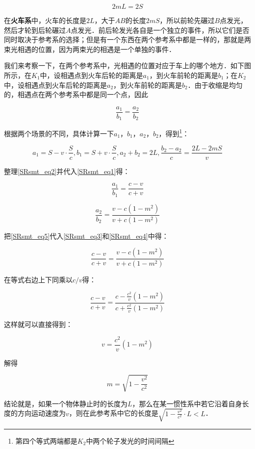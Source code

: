 \begin{equation}\label{SRsmt_eq1}
2mL=2S
\end{equation}

在\textbf{火车系}中，火车的长度是$2L$，大于$AB$的长度$2mS$，所以前轮先碾过$B$点发光，然后才轮到后轮碾过$A$点发光．前后轮发光各自是一个独立的事件，所以它们是否同时取决于参考系的选择；但是有一个东西在两个参考系中都是一样的，那就是两束光相遇的位置，因为两束光的相遇是一个单独的事件．

我们来考察一下，在两个参考系中，光相遇的位置对应于车上的哪个地方．如下图所示，在$K_1$中，设相遇点到火车后轮的距离是$a_1$，到火车前轮的距离是$b_1$；在$K_2$中，设相遇点到火车后轮的距离是$a_2$，到火车前轮的距离是$b_2$．由于收缩是均匀的，相遇点在两个参考系中都是同一个点，因此

\begin{equation}\label{SRsmt_eq5}
\frac{a_1}{b_1}=\frac{a_2}{b_2}
\end{equation}

根据两个场景的不同，具体计算一下$a_1$，$b_1$，$a_2$，$b_2$，得到\footnote{第四个等式两端都是$K_2$中两个轮子发光的时间间隔}：

\begin{equation}\label{SRsmt_eq2}
a_1=S-v\cdot\frac{S}{c},b_1=S+v\cdot\frac{S}{c},a_2+b_2=2L,\frac{b_2-a_2}{c}=\frac{2L-2mS}{v}
\end{equation}

整理\autoref{SRsmt_eq2}并代入\autoref{SRsmt_eq1}得：

\begin{equation}\label{SRsmt_eq3}
\frac{a_1}{b_1}=\frac{c-v}{c+v}
\end{equation}

\begin{equation}\label{SRsmt_eq4}
\frac{a_2}{b_2}=\frac{v-c(1-m^2)}{v+c(1-m^2)}
\end{equation}

把\autoref{SRsmt_eq5}代入\autoref{SRsmt_eq3}和\autoref{SRsmt_eq4}中得：

\begin{equation}
\frac{c-v}{c+v}=\frac{v-c(1-m^2)}{v+c(1-m^2)}
\end{equation}

在等式右边上下同乘以$c/v$得：

\begin{equation}
\frac{c-v}{c+v}=\frac{c-\frac{c^2}{v}(1-m^2)}{c+\frac{c^2}{v}(1-m^2)}
\end{equation}

这样就可以直接得到：

\begin{equation}
v=\frac{c^2}{v}(1-m^2)
\end{equation}

解得

\begin{equation}
m=\sqrt{1-\frac{v^2}{c^2}}
\end{equation}

结论就是，如果一个物体静止时的长度为$L$，那么在某一惯性系中若它沿着自身长度的方向运动速度为$v$，则在此参考系中它的长度是$\sqrt{1-\frac{v^2}{c^2}}\cdot L<L$．






